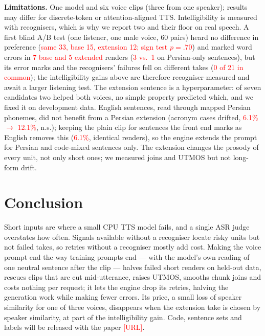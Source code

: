 \documentclass[conference]{IEEEtran}
\newcommand{\RES}[1]{\textcolor{red}{#1}}
\begin{document}
\textbf{Limitations.} One model and six voice clips (three from one speaker); results may differ for discrete-token or
attention-aligned TTS. Intelligibility is measured with recognisers, which is why we report two and their
floor on real speech. A first blind A/B test (one listener, one male voice, 60 pairs) heard no difference
in preference (\RES{same 33, base 15, extension 12; sign test $p=.70$}) and marked word errors in \RES{7 base
and 5 extended} renders (\RES{3 vs.\ 1} on Persian-only sentences), but its error marks and the
recognisers' failures fell on different takes (\RES{0 of 21 in common}); the intelligibility gains above
are therefore recogniser-measured and await a larger listening test. The
extension sentence is a hyperparameter: of seven candidates two helped both voices, no simple property
predicted which, and we fixed it on development data. English sentences, read through mapped Persian phonemes, did not benefit from a Persian
extension (acronym cases drifted, \RES{6.1\% $\to$ 12.1\%}, n.s.); keeping the plain clip for sentences the
front end marks as English removes this (\RES{6.1\%}, identical renders), so the engine extends the prompt
for Persian and code-mixed sentences only. The extension changes the prosody of every unit, not only short
ones; we measured joins and UTMOS but not long-form drift.

\section{Conclusion}
Short inputs are where a small CPU TTS model fails, and a single ASR judge overstates how often. Signals
available without a recogniser locate risky units but not failed takes, so retries without a recogniser
mostly add cost. Making the voice prompt end the way training prompts end --- with the model's own reading of
one neutral sentence after the clip --- halves failed short renders on held-out data, rescues clips that
are cut mid-utterance, raises UTMOS, smooths chunk joins and costs nothing per request; it lets the engine drop its retries, halving the generation work
while making fewer errors. Its price, a small loss of speaker similarity for one of three voices, disappears when the
extension take is chosen by speaker similarity, at part of the intelligibility gain. Code,
sentence sets and labels will be released with the paper \RES{[URL]}.



\end{document}
